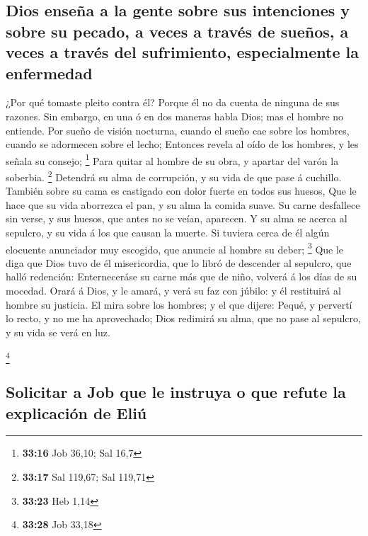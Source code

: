 \hypertarget{dios-enseuxf1a-a-la-gente-sobre-sus-intenciones-y-sobre-su-pecado-a-veces-a-travuxe9s-de-sueuxf1os-a-veces-a-travuxe9s-del-sufrimiento-especialmente-la-enfermedad}{%
\subsection{Dios enseña a la gente sobre sus intenciones y sobre su
pecado, a veces a través de sueños, a veces a través del sufrimiento,
especialmente la
enfermedad}\label{dios-enseuxf1a-a-la-gente-sobre-sus-intenciones-y-sobre-su-pecado-a-veces-a-travuxe9s-de-sueuxf1os-a-veces-a-travuxe9s-del-sufrimiento-especialmente-la-enfermedad}}

 ¿Por qué tomaste pleito contra él? Porque él no da cuenta
de ninguna de sus razones.  Sin embargo, en una ó en dos
maneras habla Dios; mas el hombre no entiende.  Por sueño
de visión nocturna, cuando el sueño cae sobre los hombres, cuando se
adormecen sobre el lecho;  Entonces revela al oído de los
hombres, y les señala su consejo; \footnote{\textbf{33:16} Job 36,10;
  Sal 16,7}  Para quitar al hombre de su obra, y apartar
del varón la soberbia. \footnote{\textbf{33:17} Sal 119,67; Sal 119,71}
 Detendrá su alma de corrupción, y su vida de que pase á
cuchillo.  También sobre su cama es castigado con dolor
fuerte en todos sus huesos,  Que le hace que su vida
aborrezca el pan, y su alma la comida suave.  Su carne
desfallece sin verse, y sus huesos, que antes no se veían, aparecen.
 Y su alma se acerca al sepulcro, y su vida á los que
causan la muerte.  Si tuviera cerca de él algún elocuente
anunciador muy escogido, que anuncie al hombre su deber; \footnote{\textbf{33:23}
  Heb 1,14}  Que le diga que Dios tuvo de él misericordia,
que lo libró de descender al sepulcro, que halló redención:
 Enterneceráse su carne más que de niño, volverá á los días
de su mocedad.  Orará á Dios, y le amará, y verá su faz con
júbilo: y él restituirá al hombre su justicia.  El mira
sobre los hombres; y el que dijere: Pequé, y pervertí lo recto, y no me
ha aprovechado;  Dios redimirá su alma, que no pase al
sepulcro, y su vida se verá en luz.

\footnote{\textbf{33:28} Job 33,18}

\hypertarget{solicitar-a-job-que-le-instruya-o-que-refute-la-explicaciuxf3n-de-eliuxfa}{%
\subsection{Solicitar a Job que le instruya o que refute la explicación
de
Eliú}\label{solicitar-a-job-que-le-instruya-o-que-refute-la-explicaciuxf3n-de-eliuxfa}}

